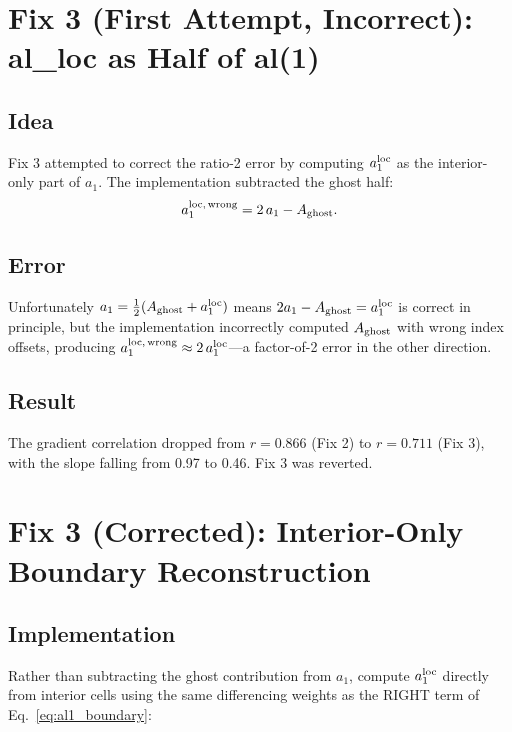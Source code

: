 \documentclass[11pt]{article}
\begin{document}
\section{Fix 3 (First Attempt, Incorrect): al\_loc as Half of al(1)}

\subsection{Idea}

Fix 3 attempted to correct the ratio-2 error by computing $a_1^{\rm loc}$
as the interior-only part of $a_1$. The implementation subtracted the ghost
half:
\begin{equation}
  a_1^{\rm loc,\,wrong} = 2\,a_1 - A_{\rm ghost}.
\end{equation}

\subsection{Error}

Unfortunately $a_1 = \tfrac{1}{2}(A_{\rm ghost} + a_1^{\rm loc})$ means
$2a_1 - A_{\rm ghost} = a_1^{\rm loc}$ is correct in principle, but the
implementation incorrectly computed $A_{\rm ghost}$ with wrong index offsets,
producing $a_1^{\rm loc,\,wrong} \approx 2\,a_1^{\rm loc}$---a factor-of-2
error in the other direction.

\subsection{Result}

The gradient correlation dropped from $r = 0.866$ (Fix 2) to $r = 0.711$
(Fix 3), with the slope falling from 0.97 to 0.46. Fix 3 was reverted.

\section{Fix 3 (Corrected): Interior-Only Boundary Reconstruction}

\subsection{Implementation}

Rather than subtracting the ghost contribution from $a_1$, compute
$a_1^{\rm loc}$ directly from interior cells using the same differencing
weights as the RIGHT term of Eq.~\eqref{eq:al1_boundary}:
\end{document}
